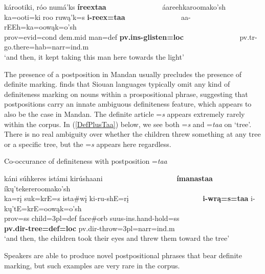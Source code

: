 \begin{exe}
\begin{xlist}
\item\label{ExamplesOfTaaWithI6} \glll károotiki, róo numá'ks \textbf{íreextaa} ~ ~ ~ ~ ~ ~ ~ ~ ~ áareehkaroomako'sh\\
    ka=ooti=ki roo ruwą'k=s \textbf{i-reex=taa} ~ ~ ~ ~ ~ ~ ~ ~ ~  aa-rEEh=ka=oowąk=o'sh\\
    prov=evid=cond dem.mid \textnormal{man}=def \textbf{pv.ins-\textnormal{\bfseries glisten}=loc} ~ ~ ~ ~ ~ ~ ~ ~ ~  pv.tr-\textnormal{go.there}=hab=narr=ind.m\\
    \glt `and then, it kept taking this man here towards the light' \citep[95]{hollow1973b}

\end{xlist}

\end{exe}

The presence of a postposition in Mandan usually precludes the presence of definite marking. \citet{coen2021} finds that Siouan languages typically omit any kind of definiteness marking on nouns within a prospositional phrase, suggesting that postpositions carry an innate ambiguous definiteness feature, which appears to also be the case in Mandan. The definite article =\textit{s} appears extremely rarely within the corpus. In (\ref{DefPlusTaa}) below, we see both =\textit{s} and =\textit{taa} on `tree'. There is no real ambiguity over whether the children threw something at any tree or a specific tree, but the =\textit{s} appears here regardless.

\begin{exe}
	\item\label{DefPlusTaa} Co-occurance of definiteness with postposition =\textit{taa}
	
	\glll káni súh{kere}s istámi kirúshaani ~ ~ ~ ~ ~ ~ ~ ~ ~ ~ ~ ~  \textbf{ímanastaa} íkų'te{kere}roomako'sh\\
	ka=rį suk={krE}=s ista\#wį ki-ru-shE=rį ~ ~ ~ ~ ~ ~ ~ ~ ~ ~ ~ ~   \textbf{i-wrą=s=taa} i-kų'tE={krE}=oowąk=o'sh\\
	prov=ss \textnormal{child}={3pl}=def \textnormal{face}\#\textnormal{orb} suus-ins.hand-\textnormal{hold}=ss ~ ~ ~ ~ ~ ~ ~ ~ ~ ~ ~ ~  \textbf{pv.dir-\textnormal{\bfseries tree}=def=loc} pv.dir-\textnormal{throw}={3pl}=narr=ind.m\\
	\glt `and then, the children took their eyes and threw them toward the tree' \citep[29]{hollow1973a}
\end{exe}

Speakers are able to produce novel postpositional phrases that bear definite marking, but such examples are very rare in the corpus.

